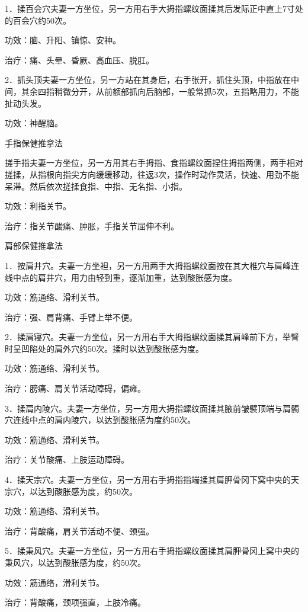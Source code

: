 \documentclass[12pt,UTF8]{ctexbook}
\begin{document}
1．揉百会穴夫妻一方坐位，另一方用右手大拇指螺纹面揉其后发际正中直上7寸处的百会穴约50次。

功效：脑、升阳、镇惊、安神。

治疗：痛、头晕、昏厥、高血压、脱肛。

2．抓头顶夫妻一方坐位，另一方站在其身后，右手张开，抓住头顶，中指放在中间，其余四指稍微分开，从前额部抓向后脑部，一般常抓5次，五指略用力，不能扯动头发。

功效：神醒脑。





手指保健推拿法


搓手指夫妻一方坐位，另一方用其右手拇指、食指螺纹面捏住拇指两侧，两手相对搓揉，从指根向指尖方向缓缓移动，往返3次，操作时动作灵活，快速、用劲不能呆滞。然后依次搓揉食指、中指、无名指、小指。

功效：利指关节。

治疗：指关节酸痛、肿胀，手指关节屈伸不利。





肩部保健推拿法


1．按肩井穴。夫妻一方坐袒，另一方用两手大拇指螺纹面按在其大椎穴与肩峰连线中点的肩井穴，用力由轻到重，逐渐加重，达到酸胀感为度。

功效：筋通络、滑利关节。

治疗：强、肩背痛、手臂上举不便。

2．揉肩寝穴。夫妻一方坐位，另一方用右手大拇指螺纹面揉其肩峰前下方，举臂时呈凹陷处的肩外穴约50次。揉时以达到酸胀感为度。

功效：筋通络、滑利关节。

治疗：膀痛、肩关节活动障碍，偏瘫。

3．揉肩内陵穴。夫妻一方坐位，另一方用大拇指螺纹面揉其腋前皱襞顶端与肩髑穴连线中点的肩内陵穴，以达到酸胀感为度约50次。

功效：筋通络、滑利关节。

治疗：关节酸痛、上肢运动障碍。

4．揉天宗穴。夫妻一方坐位，另一方用右手拇指指端揉其肩胛骨冈下窝中央的天宗穴，以达到酸胀感为度，约50次。

功效：筋通络、滑利关节。

治疗：背酸痛，肩关节活动不便、颈强。

5．揉秉风穴。夫妻一方坐位，另一方用右手拇指螺纹面揉其肩胛骨冈上窝中央的秉风穴，以达到酸胀感为度，约50次。

功效：筋通络，滑利关节。

治疗：背酸痛，颈项强直，上肢冷痛。
\end{document}
